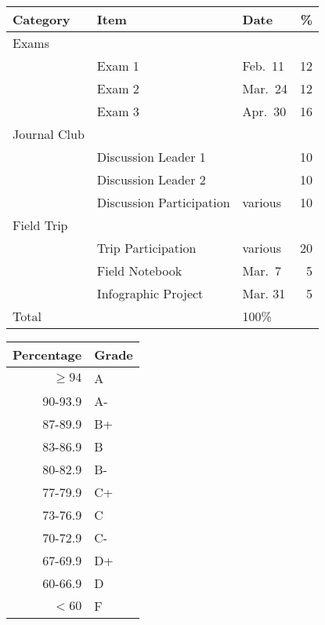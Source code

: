 \documentclass{tufte-handout}
\begin{document}
\begin{tabular}{l l l r}
Category & Item &  Date &  \%  \\
\hline
Exams \\
& Exam 1 & Feb.\ 11 & 12 \\							
& Exam 2 & Mar.\ 24 & 12 \\							
&  Exam 3 & Apr.\ 30 & 16 \\	
Journal Club \\			
& Discussion Leader 1 &   & 10 \\
& Discussion Leader 2 &   & 10 \\ 
& Discussion Participation & various & 10 \\		
Field Trip \\	
& Trip Participation & various & 20 \\
& Field Notebook & Mar.\ 7 & 5 \\				
& Infographic Project & Mar. 31 & 5 \\
\hline
Total & &   100\%
\end{tabular}


\begin{margintable}
\begin{tabular}{rl}
Percentage & Grade \\
\hline 
$\ge94$ & A \\
90-93.9 & A- \\
87-89.9 & B+ \\
83-86.9 & B \\
80-82.9 & B- \\
77-79.9 & C+ \\
73-76.9 & C \\
70-72.9 & C- \\
67-69.9 & D+ \\
60-66.9 & D \\
$<60$ & F \\
\hline
\end{tabular}
\end{margintable}
\end{document}
